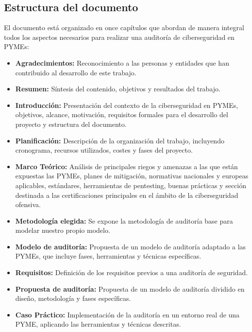 \documentclass[a4paper, 10pt]{article}
\begin{document}
\subsection{Estructura del documento}

El documento está organizado en once capítulos que abordan de manera integral todos los aspectos necesarios para realizar una auditoría de ciberseguridad en PYMEs:

\begin{itemize}
    \item \textbf{Agradecimientos:} Reconocimiento a las personas y entidades que han contribuido al desarrollo de este trabajo.
    
    \item \textbf{Resumen:} Síntesis del contenido, objetivos y resultados del trabajo.
    
    \item \textbf{Introducción:} Presentación del contexto de la ciberseguridad en PYMEs, objetivos, alcance, motivación, requisitos formales para el desarrollo del proyecto y estructura del documento.
    
    \item \textbf{Planificación:} Descripción de la organización del trabajo, incluyendo cronograma, recursos utilizados, costes y fases del proyecto.
    
    \item \textbf{Marco Teórico:} Análisis de principales riegos y amenazas a las que están expuestas las PYMEs, planes de mitigación, normativas nacionales y europeas aplicables, estándares, herramientas de pentesting, buenas prácticas y sección destinada a las certificaciones principales en el ámbito de la ciberseguridad ofensiva.
    

    \item \textbf{Metodología elegida:} Se expone la metodología de auditoría base para modelar nuestro propio modelo.
    \item \textbf{Modelo de auditoría:} Propuesta de un modelo de auditoría adaptado a las PYMEs, que incluye fases, herramientas y técnicas específicas.
    \item \textbf{Requisitos:} Definición de los requisitos previos a una auditoría de seguridad.
    
    \item \textbf{Propuesta de auditoría:} Propuesta de un modelo de auditoría dividido en diseño, metodología y fases específicas.
    
    \item \textbf{Caso Práctico:} Implementación de la auditoría en un entorno real de una PYME, aplicando las herramientas y técnicas descritas.
    

\end{itemize}
\end{document}
